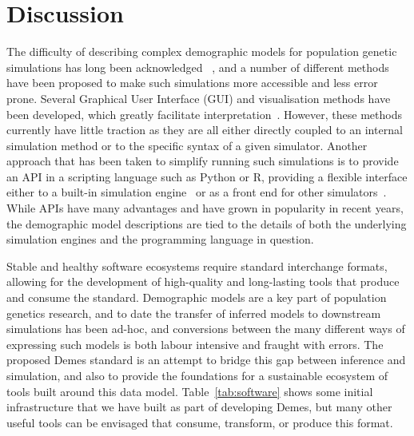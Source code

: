\documentclass[11pt]{article}
\begin{document}
\section*{Discussion}

The difficulty of describing complex demographic models
for population genetic simulations has long been acknowledged
~\citep[][e.g.]{antao2007modeler4simcoal2}, %
and a number of different methods have been proposed to
make such simulations more accessible and less error prone.
Several Graphical User Interface (GUI) and visualisation
methods have been developed, which greatly facilitate
interpretation~\citep{mailund2005coasim,antao2007modeler4simcoal2,
ewing2010msms,zhou2018popdemog}. However, these methods
currently have little traction as they are all either directly coupled
to an internal simulation method or to the specific syntax
of a given simulator. Another approach that has been taken to
simplify running such simulations is to provide an API in a
scripting language such as Python or R, providing a flexible
interface either to a built-in simulation
engine~\citep{thornton2014cpp,thornton2019-nu,baumdicker2021-iu,kelleher2016efficient,haller2017flexible}
or as a front end for other simulators~\citep{staab2016coala}.
While APIs have many advantages and have grown in popularity in
recent years, the demographic model descriptions are tied
to the details of both the underlying simulation engines
and the programming language in question.

Stable and healthy software ecosystems require standard interchange
formats, allowing for the development of high-quality and long-lasting
tools that produce and consume the standard.
Demographic models are a key part of population genetics research,
and to date the transfer of inferred models to downstream simulations
has been ad-hoc, and conversions between the many different ways
of expressing such models is both labour intensive and fraught with errors.
The proposed Demes standard is an attempt to bridge this gap
between inference and simulation, and also to provide the foundations
for a sustainable ecosystem of tools built around this data model.
Table~\ref{tab:software} shows some initial infrastructure that we have
built as part of developing Demes, but many other useful tools
can be envisaged that consume, transform, or produce this format.
\end{document}
